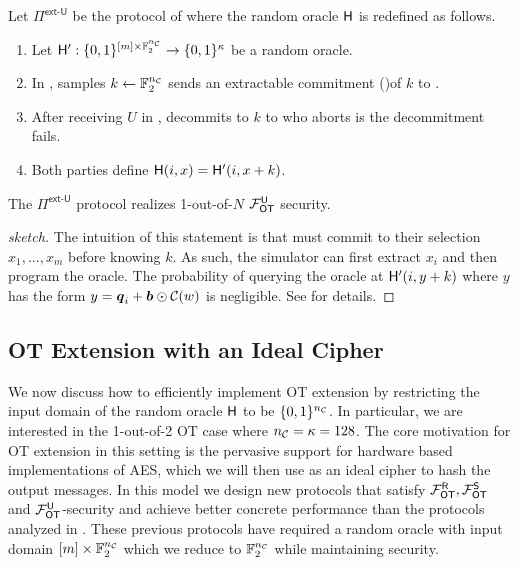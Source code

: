 \begin{definition}\label{def:ext_Su_U}
	Let $\Pi^{\textsf{ext-U}}$ be the protocol of  where the random oracle $\mathsf{H}$ is redefined as follows. 
	\begin{enumerate}
		\item Let $\mathsf{H}':\{0,1\}^{[m]\times \mathbb{F}^{{n_\mathcal{C}}}_2}\rightarrow\{0,1\}^\kappa$ be a random oracle.
		\item In , \send samples $k\gets\mathbb{F}^{{n_\mathcal{C}}}_2$ sends an extractable commitment \iffullversion()\fi of $k$ to \rec. 
		\item After receiving $U$ in , \send decommits to $k$ to \rec who aborts is the decommitment fails.
		\item Both parties define $\mathsf{H}(i,x)=\mathsf{H}'(i,x+k)$.
	\end{enumerate}
\end{definition}
\begin{lemma}
	The $\Pi^{\textsf{ext-U}}$ protocol realizes 1-out-of-$N$ $\mathcal{F}_{\mathsf{OT}}^\mathsf{U}$ security.
\end{lemma}
%
\iffullversion

\else
\begin{proof}[sketch]
	The intuition of this statement is that \rec must commit to their selection $x_1,...,x_m$ before knowing $k$. As such, the simulator can first extract $x_i$ and then program the oracle. The probability of \rec querying the oracle at $\mathsf{H}'(i,y+k)$ where $y$ has the form $y=\boldsymbol{q}_i + \boldsymbol{b} \odot\mathcal{C}(w)$ is negligible. See  for details.
\end{proof}
\fi


\subsection{OT Extension with an Ideal Cipher}\label{sec:extIdealCipher}
We now discuss how to efficiently implement OT extension by restricting the input domain of the random oracle $\mathsf{H}$ to be $\{0,1\}^{{n_\mathcal{C}}}$. In particular, we are interested in the 1-out-of-2 OT case where ${n_\mathcal{C}}=\kappa=128$. The core motivation for OT extension in this setting is the pervasive support for hardware based implementations of AES, which we will then use as an ideal cipher to hash the output messages. In this model we design new protocols that satisfy $\mathcal{F}_{\mathsf{OT}}^\mathsf{R}, \mathcal{F}_{\mathsf{OT}}^\mathsf{S}$ and $\mathcal{F}_{\mathsf{OT}}^\mathsf{U}$-security and achieve better concrete performance than the protocols analyzed in  . These previous protocols have required a random oracle with input domain $[m]\times \mathbb{F}^{{n_\mathcal{C}}}_2$ which we reduce to $\mathbb{F}^{{n_\mathcal{C}}}_2$ while maintaining security. 


